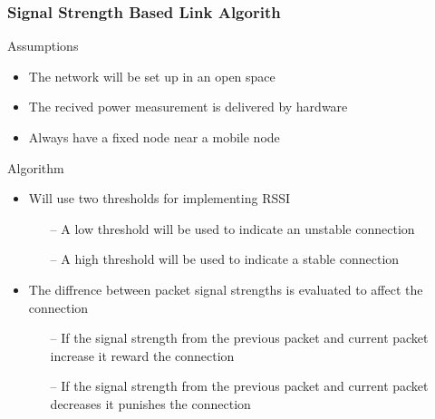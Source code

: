 \begin{frame}[t]
  \frametitle{Signal Strength Based Link Algorith}

  Assumptions
  \begin{itemize}
  \item The network will be set up in an open space
  \item The recived power measurement is delivered by hardware
  \item Always have a fixed node near a mobile node
  \end{itemize}

  \vfill
  
  Algorithm
  \begin{itemize}
  \item Will use two thresholds for implementing RSSI
    \begin{itemize}
      \item[--] A low threshold will be used to indicate an unstable connection
      \item[--] A high threshold will be used to indicate a stable connection
    \end{itemize}
  \item The diffrence between packet signal strengths is evaluated to affect
    the connection
    \begin{itemize}
      \item[--] If the signal strength from the previous packet and current
        packet increase it reward the connection
      \item[--] If the signal strength from the previous packet and current
        packet decreases it punishes the connection
    \end{itemize}
  \end{itemize}

  \vfill

  \begin{flushleft}
    \begin{tiny}
      \begin{minipage}{1.0\linewidth}
      \end{minipage}
    \end{tiny}
  \end{flushleft}

\end{frame}    


